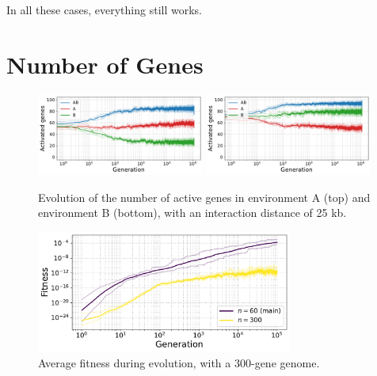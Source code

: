 In all these cases, everything still works.






\FloatBlock

\section{Number of Genes}

\begin{figure}[H]
\centering
\includegraphics[width=0.49\textwidth]{param/300-genes/gene_activity_env_A.pdf}
\includegraphics[width=0.49\textwidth]{param/300-genes/gene_activity_env_B.pdf}
\caption[Evolution of the number of active genes in each environment, with a 300-gene genome]{Evolution of the number of active genes in environment A (top) and environment B (bottom), with an interaction distance of 25 kb.}
\end{figure}

\begin{figure}[H]
\centering
\includegraphics[width=0.75\textwidth]{param/300-genes/fitness_all_with_main.pdf}
\caption[Average fitness during evolution, with a 300-gene genome]{Average fitness during evolution, with a 300-gene genome.}
\end{figure}


